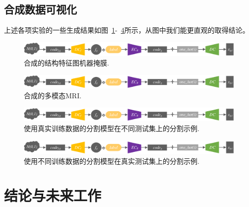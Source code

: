 \documentclass[letterpaper]{article} %
\begin{document}
\subsection{合成数据可视化}

上述各项实验的一些生成结果如图~\ref{generated_f}-~\ref{label_from_diff_train}所示，从图中我们能更直观的取得结论。
\begin{figure}
	\centering
	\includegraphics[width=0.98\linewidth]{figures/make_data}
	\caption{合成的结构特征图机器掩膜.}
	\label{generated_f}
\end{figure}

\begin{figure}
	\centering
	\includegraphics[width=0.98\linewidth]{figures/make_data}
	\caption{合成的多模态MRI.}
	\label{generated_mri}
\end{figure}

\begin{figure}
	\centering
	\includegraphics[width=0.98\linewidth]{figures/make_data}
	\caption{使用真实训练数据的分割模型在不同测试集上的分割示例.}
	\label{label_from_diff_test}
\end{figure}

\begin{figure}
	\centering
	\includegraphics[width=0.98\linewidth]{figures/make_data}
	\caption{使用不同训练数据的分割模型在真实测试集上的分割示例.}
	\label{label_from_diff_train}
\end{figure}

\section{结论与未来工作}
\end{document}

